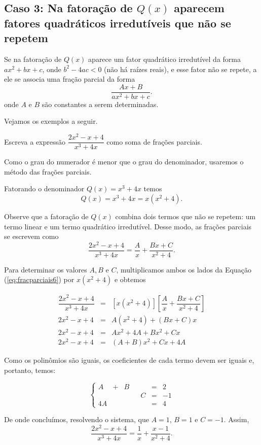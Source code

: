 \subsection{Caso 3: Na fatoração de $Q(x)$ aparecem fatores quadráticos irredutíveis que não se repetem}

Se na fatoração de $Q(x)$ aparece um fator quadrático irredutível da forma $ax^2 + bx + c$, onde $b^2 - 4ac < 0$ (não há raízes reais), e esse fator não se repete, a ele se associa uma fração parcial da forma
$$\dfrac{Ax + B}{ax^2 + bx + c}.$$
onde $A$ e $B$ são constantes a serem determinadas.

Vejamos os exemplos a seguir.

\begin{exem}
    Escreva a expressão $\dfrac{2x^2 - x + 4}{x^3 + 4x}$ como soma de frações parciais.

    Como o grau do numerador é menor que o grau do denominador, usaremos o método das frações parciais.

    Fatorando o denominador $Q(x) = x^3 + 4x$ temos $$Q(x) = x^3 + 4x = x(x^2 + 4).$$
    
    Observe que a fatoração de $Q(x)$ combina dois termos que não se repetem: um termo linear e um termo quadrático irredutível. Desse modo, as frações parciais se escrevem como 
    \begin{equation}
    \label{eq:fracparciais6}
    \dfrac{2x^2 - x + 4}{x^3 + 4x} = \dfrac{A}{x} + \dfrac{Bx + C}{x^2+4}.
    \end{equation}

    Para determinar os valores $A, B$ e $C$, multiplicamos ambos os lados da Equação (\ref{eq:fracparciais6}) por $x(x^2 + 4)$ e obtemos

     \begin{eqnarray*}
    [x(x^2 + 4)]\dfrac{2x^2 - x + 4}{x^3 + 4x} & = & [x(x^2 + 4)] \left[\dfrac{A}{x} + \dfrac{Bx + C}{x^2+4}\right]\\[5pt]
    2x^2 - x + 4 & =& A(x^2 + 4) + (Bx + C)x \\[5pt]
    2x^2 - x + 4 & =& Ax^2 + 4A + Bx^2  + Cx\\[5pt]
    2x^2 - x + 4 & = & (A+B)x^2 + Cx + 4A
    \end{eqnarray*}

    Como os polinômios são iguais, os coeficientes de cada termo devem ser iguais e, portanto, temos:

    \begin{equation*}
    \left\{ \begin{array}{ccccccc} 
    A & + & B &  &  &=& 2 \\[5pt]
     &  &  &  & C&=& -1\\[5pt]
    4A &  &  &  &  &=& 4
    \end{array}
    \right.    
    \end{equation*}

    De onde concluímos, resolvendo o sistema, que $A = 1, \, B = 1$ e $C = -1$. Assim, $$\dfrac{2x^2 - x + 4}{x^3 + 4x} = \dfrac{1}{x} + \dfrac{x -1}{x^2 + 4}.$$
 \end{exem}


